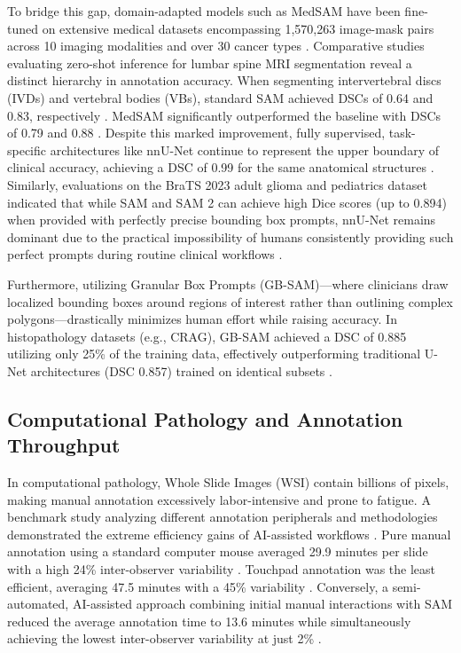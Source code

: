 \documentclass[conference]{IEEEtran}
\begin{document}
To bridge this gap, domain-adapted models such as MedSAM have been fine-tuned on extensive medical datasets encompassing 1,570,263 image-mask pairs across 10 imaging modalities and over 30 cancer types \cite{ref12}. Comparative studies evaluating zero-shot inference for lumbar spine MRI segmentation reveal a distinct hierarchy in annotation accuracy. When segmenting intervertebral discs (IVDs) and vertebral bodies (VBs), standard SAM achieved DSCs of 0.64 and 0.83, respectively \cite{ref14}. MedSAM significantly outperformed the baseline with DSCs of 0.79 and 0.88 \cite{ref14}. Despite this marked improvement, fully supervised, task-specific architectures like nnU-Net continue to represent the upper boundary of clinical accuracy, achieving a DSC of 0.99 for the same anatomical structures \cite{ref14}. Similarly, evaluations on the BraTS 2023 adult glioma and pediatrics dataset indicated that while SAM and SAM 2 can achieve high Dice scores (up to 0.894) when provided with perfectly precise bounding box prompts, nnU-Net remains dominant due to the practical impossibility of humans consistently providing such perfect prompts during routine clinical workflows \cite{ref15}.

Furthermore, utilizing Granular Box Prompts (GB-SAM)---where clinicians draw localized bounding boxes around regions of interest rather than outlining complex polygons---drastically minimizes human effort while raising accuracy. In histopathology datasets (e.g., CRAG), GB-SAM achieved a DSC of 0.885 utilizing only 25\% of the training data, effectively outperforming traditional U-Net architectures (DSC 0.857) trained on identical subsets \cite{ref18}.

\subsection{Computational Pathology and Annotation Throughput}
In computational pathology, Whole Slide Images (WSI) contain billions of pixels, making manual annotation excessively labor-intensive and prone to fatigue. A benchmark study analyzing different annotation peripherals and methodologies demonstrated the extreme efficiency gains of AI-assisted workflows \cite{ref15}. Pure manual annotation using a standard computer mouse averaged 29.9 minutes per slide with a high 24\% inter-observer variability \cite{ref1}. Touchpad annotation was the least efficient, averaging 47.5 minutes with a 45\% variability \cite{ref19}. Conversely, a semi-automated, AI-assisted approach combining initial manual interactions with SAM reduced the average annotation time to 13.6 minutes while simultaneously achieving the lowest inter-observer variability at just 2\% \cite{ref19}.
\end{document}
